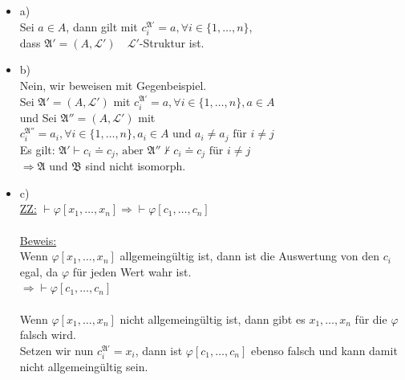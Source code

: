\documentclass[a4paper]{scrartcl}
\begin{document}
    \begin{itemize}
        \item a)\\
            Sei $a \in A$, dann gilt mit $c_i^{\mathfrak{A'}} = a, \forall i \in \{1,\dots,n\}$,\\
            dass $\mathfrak{A'} = (A, \mathscr{L}') \quad \mathscr{L}'$-Struktur ist.\\ 

        \item b)\\
            Nein, wir beweisen mit Gegenbeispiel.\\
            Sei $\mathfrak{A}' = (A, \mathscr{L}')$ mit $c_i^{\mathfrak{A}'} = a, \forall i \in \{1,\dots,n\}, a \in A$\\
            und Sei $\mathfrak{A}'' = (A, \mathscr{L}')$ mit $c_i^{\mathfrak{A}''} = a_i, \forall i \in \{1,\dots,n\}, a_i \in A \text{ und } a_i \neq a_j
            \text{ für  } i \neq j$\\
            Es gilt: $\mathfrak{A}' \vdash c_i \doteq c_j \text{, aber } \mathfrak{A}'' \nvdash c_i \doteq c_j \text{ für } i \neq j$\\
            $\Rightarrow \mathfrak{A} \text{ und } \mathfrak{B}$ sind nicht isomorph.

        \item c)\\
            \underline{ZZ:} $\vdash \varphi[x_1,\dots,x_n] \Rightarrow \vdash \varphi[c_1,\dots,c_n]$\\
            \\\underline{Beweis:}\\
                Wenn $\varphi[x_1,\dots,x_n]$ allgemeingültig ist, dann ist die Auswertung von den $c_i$ egal, da $\varphi$ für jeden Wert wahr ist.\\
                $\Rightarrow \vdash \varphi[c_1,\dots,c_n]$\\
                \\Wenn $\varphi[x_1,\dots,x_n]$ nicht allgemeingültig ist, dann gibt es $x_1,\dots,x_n$ für die $\varphi$ falsch wird.\\
                Setzen wir nun $c_i^{\mathfrak{A}'} = x_i$, dann ist $\varphi[c_1,\dots,c_n]$ ebenso falsch und kann damit nicht allgemeingültig sein.\\
                

    \end{itemize}
\end{document}
